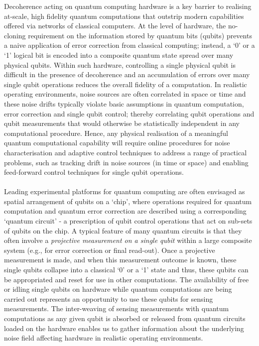 Decoherence acting on quantum computing hardware is a key barrier to realising at-scale, high fidelity quantum computations that outstrip modern capabilities offered via networks of classical computers. At the level of hardware, the no-cloning requirement on the information stored by quantum bits (qubits) prevents a naive application of error correction from classical computing; instead, a  `0' or a `1' logical bit is encoded into a composite quantum state spread over many physical qubits. Within such hardware,  controlling a single physical qubit is difficult in the presence of decoherence and an accumulation of errors over many single qubit operations reduces the overall fidelity of a computation. In realistic operating environments, noise sources are often correlated in space or time and these noise drifts typically violate basic assumptions in quantum computation, error correction and single qubit control;  thereby correlating qubit operations and qubit measurements that would otherwise be statistically independent in any computational procedure.  Hence, any physical realisation of a meaningful quantum computational capability will require online procedures for noise characterisation and adaptive control techniques to address a range of practical problems, such as tracking drift in noise sources (in time or space) and enabling feed-forward control techniques for single qubit operations. \\
\\
Leading experimental platforms for quantum computing are often envisaged as spatial arrangement of qubits on a `chip', where operations required for quantum computation and quantum error correction are described using  a corresponding `quantum circuit' - a prescription of qubit control operations that act on sub-sets of qubits on the chip. A typical feature of many quantum circuits is that they often involve a \textit{projective measurement on a single qubit } within a large composite system (e.g., for error correction or final read-out).
Once a projective measurement is made, and when this measurement outcome is known, these single qubits collapse into a classical `0' or a `1' state and thus, these qubits can be appropriated and reset for use in other computations. The availability of free or idling single qubits on hardware while quantum computations are being carried out represents an opportunity to use these qubits for sensing measurements. The inter-weaving of sensing measurements with quantum computations as any given qubit is absorbed or released from quantum circuits loaded on the hardware enables us to gather information about the underlying noise field affecting hardware in realistic operating environments.\\
